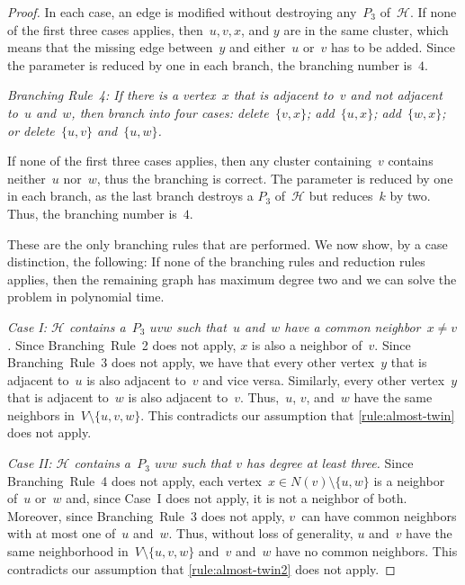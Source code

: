 \documentclass[envcountsame,numbook,smallextended]{svjour3}
\numberwithin{equation}{section}
\numberwithin{figure}{section}
\newcommand{\packing}{\ensuremath{\mathcal H}}
\begin{document}
\begin{proof}
  In each case, an edge is modified without destroying
  any~$P_3$ of~$\packing$. If none of the first three cases applies,
  then~$u,v,x$, and $y$ are in the same cluster,
  which means that the missing edge
  between~$y$ and either~$u$ or~$v$
  has to be added.
  Since the parameter is reduced by one in each branch, the branching
  number is~$4$.
 
  \emph{Branching Rule~4: If there is a vertex~$x$ that is adjacent to~$v$ and not
    adjacent to~$u$ and~$w$, then branch into four cases:
  delete~$\{v,x\}$; add~$\{u,x\}$; add~$\{w,x\}$;
  or delete~$\{u,v\}$ and~$\{u,w\}$.}

  If none of the first three cases applies,
  then any cluster containing~$v$
  contains neither~$u$ nor~$w$,
  thus the branching is correct.
  The parameter is reduced by one in each
  branch, as the last branch destroys a $P_3$ of~$\packing$ but
  reduces~$k$ by two. Thus, the branching number is~$4$.

  These are the only branching rules that are performed. We now show, by a case
  distinction, the following: If none of the branching rules and reduction rules applies,
  then the remaining graph has maximum degree two and we can solve the problem in
  polynomial time.

  \emph{Case I: $\packing$ contains a~$P_3$ $uvw$ such that~$u$ and~$w$ have a common
    neighbor~$x\neq v$.} Since Branching~Rule~2 does not apply, $x$ is also a
  neighbor of~$v$. Since Branching~Rule~3 does not apply, we have that every other vertex~$y$ that is adjacent to~$u$ is also adjacent to~$v$ and vice versa. Similarly, every other vertex~$y$ that is adjacent to~$w$ is also adjacent to~$v$. Thus,~$u$, $v$,
  and~$w$ have the same neighbors in~$V\setminus \{u,v,w\}$. 
This contradicts our assumption that
\cref{rule:almost-twin} does not apply.

  \emph{Case II: $\packing$ contains a~$P_3$ $uvw$ such that
    $v$ has degree at least three.}
  Since Branching~Rule~4 does not apply,
  each vertex~$x\in N(v)\setminus \{u,w\}$ is a neighbor
  of~$u$ or~$w$ and,
  since Case~I does not apply,
  it is not a neighbor of both.
  Moreover, since Branching~Rule~3 does not apply,
  $v$~can have common neighbors with at most one
  of~$u$ and~$w$.
  Thus, without
  loss of generality, $u$ and~$v$ have the same neighborhood
  in~$V\setminus \{u,v,w\}$ and~$v$ and~$w$ have no common neighbors.
  This contradicts our assumption that 
  \cref{rule:almost-twin2} does not apply.


\end{proof}
\end{document}
